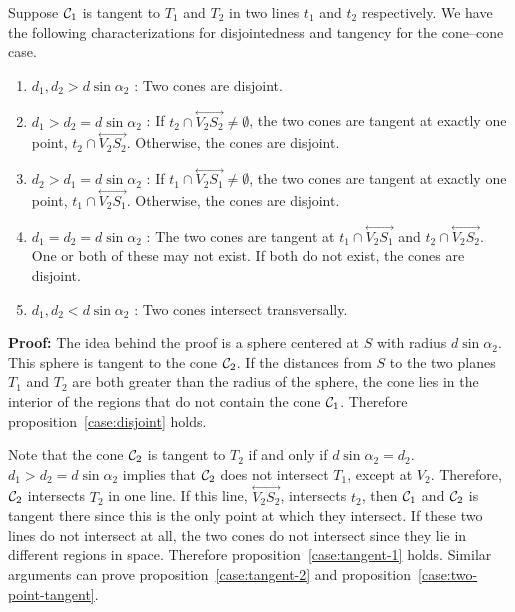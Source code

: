 \begin{theorem}
\label{theorem:tangent-disjoint}
     Suppose ${\cal C}_1$ is tangent to $T_1$ and $T_2$ in two lines $t_1$ and
$t_2$ respectively.  We have the following characterizations for 
disjointedness and tangency for the cone--cone case.
\begin{enumerate}
     \item\label{case:disjoint} $d_1, d_2>d\sin\alpha_2$ : Two cones are 
          disjoint.
     \item\label{case:tangent-1} $d_1>d_2=d\sin\alpha_2$  : If 
          $t_2\cap\!\stackrel{\longleftrightarrow}{V_2S_2}\neq\emptyset$, the 
          two cones are tangent at exactly one point, 
          $t_2\cap\!\stackrel{\longleftrightarrow}{V_2S_2}$.  
          Otherwise, the cones are disjoint.
     \item\label{case:tangent-2} $d_2>d_1=d\sin\alpha_2$  : If 
          $t_1\cap\!\stackrel{\longleftrightarrow}{V_2S_1}\neq\emptyset$, the 
          two cones are tangent at exactly one point,
          $t_1\cap\!\stackrel{\longleftrightarrow}{V_2S_1}$.  
          Otherwise, the cones are disjoint.
     \item\label{case:two-point-tangent} $d_1=d_2=d\sin\alpha_2$ :  The two 
         cones are tangent at $t_1\cap\!\stackrel{\longleftrightarrow}{V_2S_1}$
         and $t_2\cap\!\stackrel{\longleftrightarrow}{V_2S_2}$.  One or both of
          these may not exist.  If both do not exist, the cones are disjoint.
     \item\label{case:intersect} $d_1,d_2< d\sin\alpha_2$ :
          Two cones intersect transversally.
\end{enumerate}
\end{theorem}
{\bf Proof:} The idea behind the proof is a sphere centered at $S$ with radius
$d\sin\alpha_2$.  This sphere is tangent to the cone ${\cal C}_2$.  If the
distances from $S$ to the two planes $T_1$ and $T_2$ are both greater than the
radius of the sphere, the cone lies in the interior of the regions that do not
contain the cone ${\cal C}_1$. Therefore proposition~\ref{case:disjoint} holds.

     Note that the cone ${\cal C}_2$ is tangent to $T_2$ if and only if 
$d\sin\alpha_2=d_2$.  $d_1>d_2=d\sin\alpha_2$ implies that 
${\cal C}_2$ does not intersect $T_1$, except at $V_2$.  Therefore, 
${\cal C}_2$ intersects $T_2$ in one line.  If this line, 
$\stackrel{\longleftrightarrow}{V_2S_2}$, intersects $t_2$, then ${\cal C}_1$ 
and ${\cal C}_2$ is tangent there since this is the only point at which they
intersect.  If these two lines do not intersect at all, the two cones do not 
intersect since they lie in different regions in space.  Therefore 
proposition~\ref{case:tangent-1} holds.  Similar arguments can prove 
proposition~\ref{case:tangent-2} and proposition~\ref{case:two-point-tangent}.


